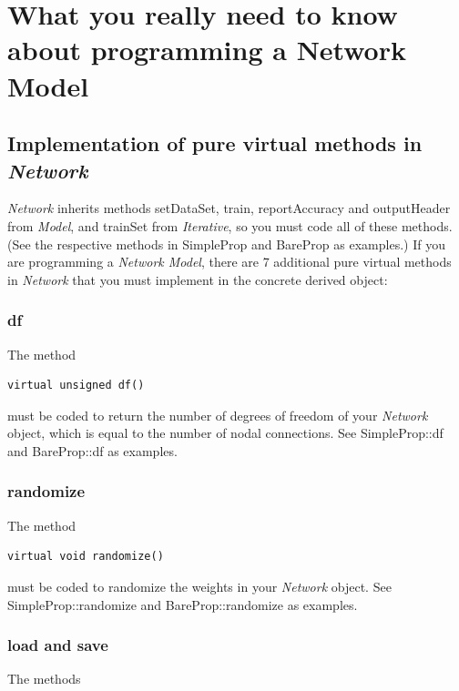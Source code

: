 \documentclass{report}
\begin{document}
\section{What you really need to know about programming a Network
Model}

\subsection{Implementation of pure virtual methods in {\em Network}}
\label{NetworkMethodsSect}

{\em Network} inherits methods setDataSet, train, reportAccuracy and
outputHeader from {\em Model}, and trainSet from {\em Iterative}, so
you must code all of these methods.  (See the respective methods in
SimpleProp and BareProp as examples.)  If you are programming a {\em
Network Model}, there are 7 additional pure virtual methods in {\em
Network} that you must implement in the concrete derived object:

\subsubsection{df}

The method

\begin{verbatim}
virtual unsigned df()
\end{verbatim}

must be coded to return the number of degrees of freedom of your {\em
Network} object, which is equal to the number of nodal connections.
See SimpleProp::df and BareProp::df as examples.

\subsubsection{randomize}

The method

\begin{verbatim}
virtual void randomize()
\end{verbatim}

must be coded to randomize the weights in your {\em Network} object.
See SimpleProp::randomize and BareProp::randomize as examples.

\subsubsection{load and save}

The methods
\end{document}
